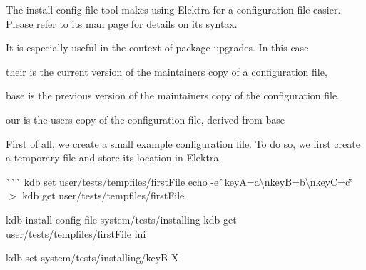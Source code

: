 The {\ttfamily install-\/config-\/file} tool makes using Elektra for a configuration file easier. Please refer to its man page for details on its syntax.

It is especially useful in the context of package upgrades. In this case


\begin{DoxyItemize}
\item {\ttfamily their} is the current version of the maintainer\textquotesingle{}s copy of a configuration file,
\item {\ttfamily base} is the previous version of the maintainer\textquotesingle{}s copy of the configuration file.
\item {\ttfamily our} is the user\textquotesingle{}s copy of the configuration file, derived from {\ttfamily base}
\end{DoxyItemize}

First of all, we create a small example configuration file. To do so, we first create a temporary file and store its location in Elektra.

\`{}\`{}\`{} kdb set user/tests/tempfiles/first\+File  echo -\/e \char`\"{}key\+A=a\textbackslash{}nkey\+B=b\textbackslash{}nkey\+C=c\char`\"{} $>$ {\ttfamily kdb get user/tests/tempfiles/first\+File} 
\begin{DoxyCode}{0}
\end{DoxyCode}


kdb install-\/config-\/file system/tests/installing {\ttfamily kdb get user/tests/tempfiles/first\+File} ini 
\begin{DoxyCode}{0}
\end{DoxyCode}


kdb set system/tests/installing/keyB X 
\begin{DoxyCode}{0}
\DoxyCodeLine{}
\end{DoxyCode}


